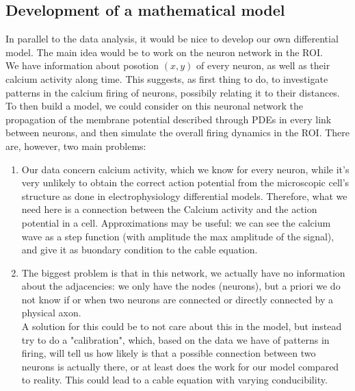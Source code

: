 \documentclass[a4paper]{article}
\begin{document}
 \newpage
		
		
	\subsection{Development of a mathematical model}
				
				
In parallel to the data analysis, it would be nice to develop our own differential model. The main idea would be to work on the neuron network in the ROI. \\
We have information about posotion $(x,y)$ of every neuron, as well as their calcium activity along time. This suggests, as first thing to do, to investigate patterns in the calcium firing of neurons, possibily relating it to their distances. \\
To then build a model, we could consider on this neuronal network the propagation of the membrane potential described through PDEs in every link between neurons, and then simulate the overall firing dynamics in the ROI. There are, however, two main problems:

\begin{enumerate}
	
	\item Our data concern calcium activity, which we know for every neuron, while it's very unlikely to obtain the correct action potential from the microscopic cell's structure as done in electrophysiology differential models. Therefore, what we need here is a connection between the Calcium activity and the action potential in a cell. Approximations may be useful: we can see the calcium wave as a step function (with amplitude the max amplitude of the signal), and give it as buondary condition to the cable equation.
	
	\item The biggest problem is that in this network, we actually have no information about the adjacencies: we only have the nodes (neurons), but a priori we do not know if or when two neurons are connected or directly connected by a physical axon.\\
	A solution for this could be to not care about this in the model, but instead try to do a "calibration", which, based on the data we have of patterns in firing, will tell us how likely is that a possible connection between two neurons is actually there, or at least does the work for our model compared to reality. This could lead to a cable equation with varying conducibility.
	
	
	
\end{enumerate}		
\end{document}
